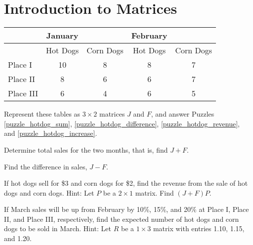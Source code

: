 \section{Introduction to Matrices}

\begin{center}
    \begin{tabular}{|l|cc|cc|}
        \hline
                  & January  &           & February &           \\
        \hline
                  & Hot Dogs & Corn Dogs & Hot Dogs & Corn Dogs \\
        \hline
        Place I   & 10       & 8         & 8        & 7         \\
        Place II  & 8        & 6         & 6        & 7         \\
        Place III & 6        & 4         & 6        & 5         \\
        \hline
    \end{tabular}
\end{center}

Represent these tables as \(3 \times 2\) matrices \(J\) and \(F\), and answer Puzzles \ref{puzzle_hotdog_sum}, \ref{puzzle_hotdog_difference}, \ref{puzzle_hotdog_revenue}, and \ref{puzzle_hotdog_increase}.


\begin{puzzle}\label{puzzle_hotdog_sum}
    Determine total sales for the two months, that is, find \(J + F\).
\end{puzzle}

\begin{puzzle}\label{puzzle_hotdog_difference}
    Find the difference in sales, \(J - F\).
\end{puzzle}

\begin{puzzle}\label{puzzle_hotdog_revenue}
    If hot dogs sell for \$3 and corn dogs for \$2, find the revenue from the sale of hot dogs and corn dogs. Hint: Let \(P\) be a \(2 \times 1\) matrix. Find \((J + F) P\).
\end{puzzle}

\begin{puzzle}\label{puzzle_hotdog_increase}
    If March sales will be up from February by 10\%, 15\%, and 20\% at Place I, Place II, and Place III, respectively, find the expected number of hot dogs and corn dogs to be sold in March. Hint: Let \(R\) be a \(1 \times 3\) matrix with entries 1.10, 1.15, and 1.20.
\end{puzzle}

